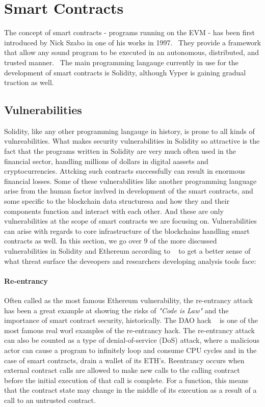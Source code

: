 \section{Smart Contracts}
    The concept of smart contracts - programs running on the EVM - has been first introduced by Nick Szabo in one of his works in 1997.~\cite{szabo1997formalizing}
    They provide a framework that allow any sound program to be executed in an autonomous, distributed, and trusted manner.~\cite{nguyen2020sfuzz}
    The main programming langauge currently in use for the development of smart contracts is Solidity, although Vyper is gaining gradual traction as well.

    \subsection{Vulnerabilities}
        Solidity, like any other programming langauge in history, is prone to all kinds of vulnreabilities.
        What makes security vulnerabilities in Solidity so attractive is the fact that the programs written in Solidity are very much often used in the financial sector,
        handling millions of dollars in digital aassets and cryptocurrencies. Attcking such contracts successfully can result in enormous financial losses.
        Some of these vulnerabilities like another programming language arise from the human factor invlved in development of the smart contracts, and some specific to the blockchain data structuresa and how they and their components function and interact with each other.
        And these are only vulnerabilities at the scope of smart contracts we are focusing on. Vulnerabilities can arise with regards to core infrastructure of the blockchains handling smart contracts as well.
        In this section, we go over 9 of the more discussed vulnerabilities in Solidity and Ethereum according to ~\cite{dasp} to get a better sense of what threat surface the deveopers and researchers developing analysis tools face:

            \paragraph{Re-entrancy}
            Often called as the most famous Ethereum vulnerability, the re-entrancy attack has been a great example at showing the risks of \textit{"Code is Law"} and the importance of smart contract security, historically.
            The DAO hack ~\cite{dhillon2017dao} is one of the most famous real worl examples of the re-entrancy hack.
            The re-entrancy attack can also be counted as a type of denial-of-service (DoS) attack, where a malicious actor can cause a program to infinitely loop and consume CPU cycles and in the case of smart contracts, drain a wallet of its ETH's.
            Reentrancy occurs when external contract calls are allowed to make new calls to the calling contract before the initial execution of that call is complete.
            For a function, this means that the contract state may change in the middle of its execution as a result of a call to an untrusted contract. ~\cite{dasp}

